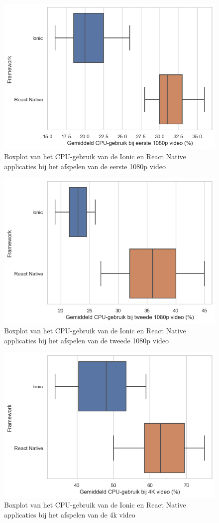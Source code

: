 \begin{figure}
  \centering
  \includegraphics[width=0.7\linewidth]{img/cpu/HD1}
  \caption{Boxplot van het CPU-gebruik van de Ionic en React Native applicaties bij het afspelen van de eerste 1080p video}
  \label{fig:Boxplot van het CPU-gebruik van de Ionic en React Native applicaties bij het afspelen van de eerste 1080p video}
\end{figure}

\begin{figure}
  \centering
  \includegraphics[width=0.7\linewidth]{img/cpu/HD2}
  \caption{Boxplot van het CPU-gebruik van de Ionic en React Native applicaties bij het afspelen van de tweede 1080p video}
  \label{fig:Boxplot van het CPU-gebruik van de Ionic en React Native applicaties bij het afspelen van de tweede 1080p video}
\end{figure}

\begin{figure}
  \centering
  \includegraphics[width=0.7\linewidth]{img/cpu/4k}
  \caption{Boxplot van het CPU-gebruik van de Ionic en React Native applicaties bij het afspelen van de 4k video}
  \label{fig:Boxplot van het CPU-gebruik van de Ionic en React Native applicaties bij het afspelen van de 4k video}
\end{figure}



